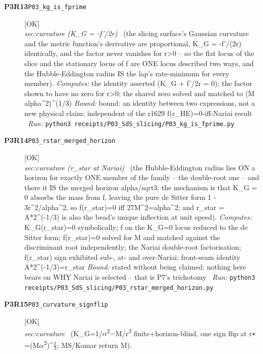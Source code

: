 \begin{description}
\item[\textbf{P3R13}\quad\texttt{P03\_kg\_is\_fprime}]\hfill\textsf{[OK]}\\
\textit{sec:curvature (K\_G = -f'/2r)} \ (the slicing surface's Gaussian curvature and the metric function's derivative are proportional, K\_G = -f'/(2r) identically, and the factor never vanishes for r>0 -- so the flat locus of the slice and the stationary locus of f are ONE locus described two ways, and the Hubble-Eddington radius IS the lap's rate-minimum for every member). 
\emph{Computes:} the identity asserted (K\_G + f'/2r = 0); the factor shown to have no zero for r>0; the shared zero solved and matched to (M alpha\textasciicircum{}2)\textasciicircum{}(1/3)
 \emph{Bound:} bound: an identity between two expressions, not a new physical claim; independent of the r1629 f(r\_HE)=0-iff-Nariai result
\ \emph{Run:} \texttt{python3 receipts/P03\_SdS\_slicing/P03\_kg\_is\_fprime.py}
\item[\textbf{P3R14}\quad\texttt{P03\_rstar\_merged\_horizon}]\hfill\textsf{[OK]}\\
\textit{sec:curvature (r\_star at Nariai)} \ (the Hubble-Eddington radius lies ON a horizon for exactly ONE member of the family -- the double-root one -- and there it IS the merged horizon alpha/sqrt3; the mechanism is that K\_G = 0 absorbs the mass from f, leaving the pure de Sitter form 1 - 3r\textasciicircum{}2/alpha\textasciicircum{}2, so f(r\_star)=0 iff 27M\textasciicircum{}2=alpha\textasciicircum{}2; and r\_star = A*2\textasciicircum{}(-1/3) is also the bead's unique inflection at unit speed). 
\emph{Computes:} K\_G(r\_star)=0 symbolically; f on the K\_G=0 locus reduced to the de Sitter form; f(r\_star)=0 solved for M and matched against the discriminant root independently; the Nariai double-root factorisation; f(r\_star) sign exhibited sub-, at- and over-Nariai; front-seam identity A*2\textasciicircum{}(-1/3)=r\_star
 \emph{Bound:} stated without being claimed: nothing here bears on WHY Nariai is selected -- that is P7's trichotomy
\ \emph{Run:} \texttt{python3 receipts/P03\_SdS\_slicing/P03\_rstar\_merged\_horizon.py}
\item[\textbf{P3R15}\quad\texttt{P03\_curvature\_signflip}]\hfill\textsf{[OK]}\\
\textit{sec:curvature} \ (K\_G=1/\ensuremath{\alpha}\textsuperscript{2}\ensuremath{-}M/r\textsuperscript{3} finite+horizon-blind, one sign flip at r\ensuremath{\star}=(M\ensuremath{\alpha}\textsuperscript{2})\textasciicircum{}\ensuremath{\tfrac13}; MS/Komar return M). 

\end{description}
